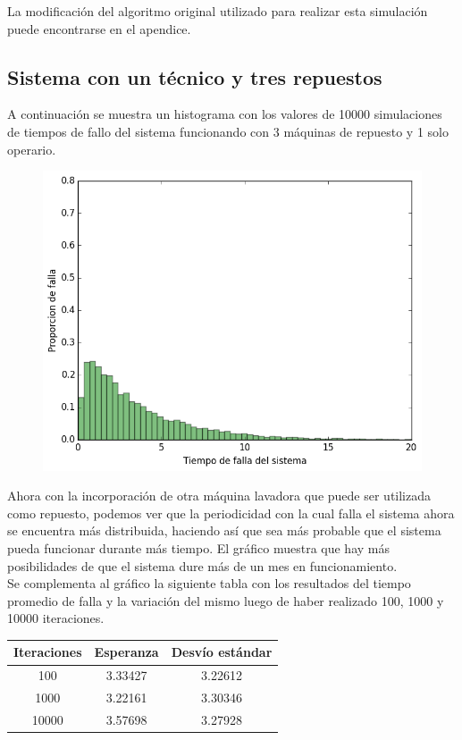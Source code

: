 \documentclass[10pt,a4paper]{article} %
\begin{document}
    La modificaci\'on del algoritmo original utilizado para realizar esta simulaci\'on puede encontrarse en el apendice.
    
    \subsection{Sistema con un t\'ecnico y tres repuestos}
    A continuaci\'on se muestra un histograma con los valores de 10000 simulaciones de tiempos de fallo del sistema funcionando con 3 m\'aquinas de repuesto y 1 solo operario.
    \begin {figure}[!htb]
    \centering
    \includegraphics[width=12cm] {img/1op3rep}
    \end {figure}

    Ahora con la incorporaci\'on de otra m\'aquina lavadora que puede ser utilizada como repuesto, podemos ver que la periodicidad con la cual falla el sistema ahora se encuentra m\'as distribuida, haciendo as\'i que sea m\'as probable que el sistema pueda funcionar durante m\'as tiempo. El gr\'afico muestra que hay m\'as posibilidades de que el sistema dure m\'as de un mes en funcionamiento. \\
    Se complementa al gr\'afico la siguiente tabla con los resultados del tiempo promedio de falla y la variaci\'on del mismo luego de haber realizado 100, 1000 y 10000 iteraciones.
    
    \begin{center}
        \begin{tabular}{ c| c| c}
            Iteraciones & Esperanza & Desv\'io est\'andar \\ \hline
            100&    3.33427 & 3.22612  \\ \hline
            1000&   3.22161 & 3.30346  \\ \hline
	        10000&  3.57698 & 3.27928  \\ \hline

        \end{tabular}
    \end{center}
    
\end{document}
